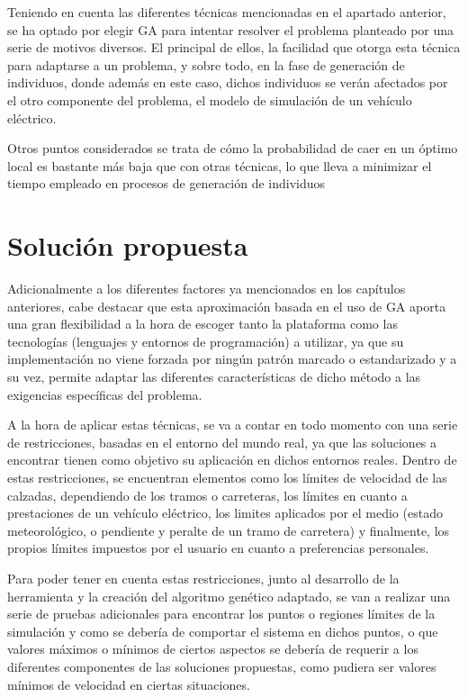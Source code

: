 \documentclass[11pt,spanish,listoffigures,listoftables]{tfgetsinf}
\begin{document}
Teniendo en cuenta las diferentes técnicas mencionadas en el apartado anterior, se ha optado por elegir GA para intentar resolver el problema planteado por una serie de motivos diversos. El principal de ellos, la facilidad que otorga esta técnica para adaptarse a un problema, y sobre todo, en la fase de generación de individuos, donde además en este caso, dichos individuos se verán afectados por el otro componente del problema, el modelo de simulación de un vehículo eléctrico.

Otros puntos considerados se trata de cómo la probabilidad de caer en un óptimo local es bastante más baja que con otras técnicas, lo que lleva a minimizar el tiempo empleado en procesos de generación de individuos

\section{Solución propuesta}
Adicionalmente a los diferentes factores ya mencionados en los capítulos anteriores, cabe destacar que esta aproximación basada en el uso de GA aporta una gran flexibilidad a la hora de escoger tanto la plataforma como las tecnologías (lenguajes y entornos de programación) a utilizar, ya que su implementación no viene forzada por ningún patrón marcado o estandarizado y a su vez, permite adaptar las diferentes características de dicho método a las exigencias específicas del problema.

A la hora de aplicar estas técnicas, se va a contar en todo momento con una serie de restricciones, basadas en el entorno del mundo real, ya que las soluciones a encontrar tienen como objetivo su aplicación en dichos entornos reales. Dentro de estas restricciones, se encuentran elementos como los límites de velocidad de las calzadas, dependiendo de los tramos o carreteras, los límites en cuanto a prestaciones de un vehículo eléctrico, los limites aplicados por el medio (estado meteorológico, o pendiente y peralte de un tramo de carretera) y finalmente, los propios límites impuestos por el usuario en cuanto a preferencias personales.

Para poder tener en cuenta estas restricciones, junto al desarrollo de la herramienta y la creación del algoritmo genético adaptado, se van a realizar una serie de pruebas adicionales para encontrar los puntos o regiones límites de la simulación y como se debería de comportar el sistema en dichos puntos, o que valores máximos o mínimos de ciertos aspectos se debería de requerir a los diferentes componentes de las soluciones propuestas, como pudiera ser valores mínimos de velocidad en ciertas situaciones.
\end{document}
